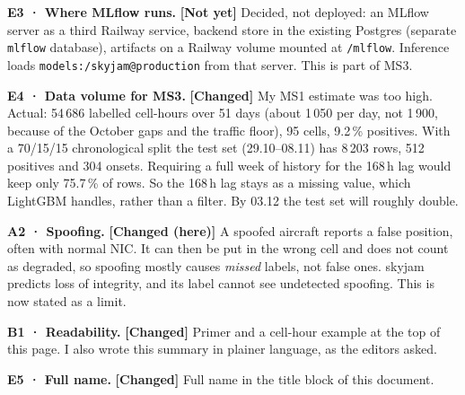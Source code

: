 \documentclass[10pt,a4paper]{article}
\newcommand{\code}[1]{\texttt{#1}}
\newcommand{\st}[1]{\textbf{[#1]}}
\begin{document}
\textbf{E3 · Where MLflow runs.} \st{Not yet} Decided, not deployed: an MLflow server as a
third Railway service, backend store in the existing Postgres (separate \code{mlflow}
database), artifacts on a Railway volume mounted at \code{/mlflow}. Inference loads
\code{models:/skyjam@production} from that server. This is part of MS3.

\textbf{E4 · Data volume for MS3.} \st{Changed} My MS1 estimate was too high. Actual: 54\,686
labelled cell-hours over 51 days (about 1\,050 per day, not 1\,900, because of the October
gaps and the traffic floor), 95 cells, 9.2\,\% positives. With a 70/15/15 chronological
split the test set (29.10--08.11) has 8\,203 rows, 512 positives and 304 onsets. Requiring
a full week of history for the 168\,h lag would keep only 75.7\,\% of rows. So the
168\,h lag stays as a missing value, which LightGBM handles, rather than a filter. By
03.12 the test set will roughly double.

\textbf{A2 · Spoofing.} \st{Changed (here)} A spoofed aircraft reports a false position,
often with normal NIC. It can then be put in the wrong cell and does not count as
degraded, so spoofing mostly causes \emph{missed} labels, not false ones. skyjam predicts
loss of integrity, and its label cannot see undetected spoofing. This is now stated as a limit.

\textbf{B1 · Readability.} \st{Changed} Primer and a cell-hour example at the top of this
page. I also wrote this summary in plainer language, as the editors asked.

\textbf{E5 · Full name.} \st{Changed} Full name in the title block of this document.
\end{document}
